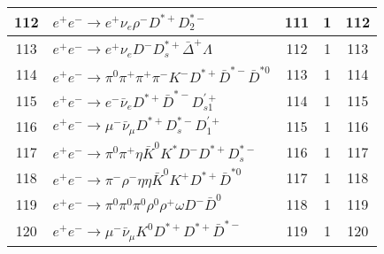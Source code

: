 \documentclass[landscape]{article}
\begin{document}
\begin{table}[htbp!]
\begin{tabular}{|c|>{\centering}p{18cm}|c|c|c|}
\hline
112 & $ e^{+} e^{-} \rightarrow e^{+} \nu_{e} \rho^{-} D^{*+} D_{2}^{*-} $ & 111 & 1 & 112 \\
\hline
113 & $ e^{+} e^{-} \rightarrow e^{+} \nu_{e} D^{-} D_{s}^{*+} \bar{\Delta}^{+} \Lambda $ & 112 & 1 & 113 \\
\hline
114 & $ e^{+} e^{-} \rightarrow \pi^{0} \pi^{+} \pi^{+} \pi^{-} K^{-} D^{*+} \bar{D}^{*-} \bar{D}^{*0} $ & 113 & 1 & 114 \\
\hline
115 & $ e^{+} e^{-} \rightarrow e^{-} \bar{\nu}_{e} D^{*+} \bar{D}^{*-} D_{s1}^{\prime+} $ & 114 & 1 & 115 \\
\hline
116 & $ e^{+} e^{-} \rightarrow \mu^{-} \bar{\nu}_{\mu} D^{*+} D_{s}^{*-} D_{1}^{\prime+} $ & 115 & 1 & 116 \\
\hline
117 & $ e^{+} e^{-} \rightarrow \pi^{0} \pi^{+} \eta \bar{K}^{0} K^{*} D^{-} D^{*+} D_{s}^{*-} $ & 116 & 1 & 117 \\
\hline
118 & $ e^{+} e^{-} \rightarrow \pi^{-} \rho^{-} \eta \eta \bar{K}^{0} K^{+} D^{*+} \bar{D}^{*0} $ & 117 & 1 & 118 \\
\hline
119 & $ e^{+} e^{-} \rightarrow \pi^{0} \pi^{0} \pi^{0} \rho^{0} \rho^{+} \omega D^{-} \bar{D}^{0} $ & 118 & 1 & 119 \\
\hline
120 & $ e^{+} e^{-} \rightarrow \mu^{-} \bar{\nu}_{\mu} K^{0} D^{*+} D^{*+} \bar{D}^{*-} $ & 119 & 1 & 120 \\
\hline
\end{tabular}
\end{table}

\clearpage
\end{document}

